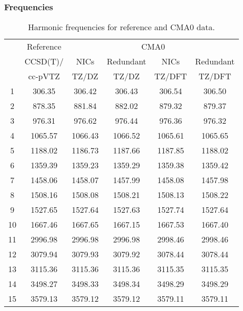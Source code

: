 \documentclass[10pt,oneside]{article}
\begin{document}
\begin{table}[h!]
\subsubsection*{Frequencies}
\centering
\caption{Harmonic frequencies for reference and CMA0 data.}
\begin{tabular}{cccccc}
\toprule
{} & Reference & \multicolumn{4}{c}{CMA0} \\
{} &  CCSD(T)/ &    NICs &  Redundant &    NICs & Redundant \\
{} &   cc-pVTZ &   TZ/DZ &      TZ/DZ &  TZ/DFT &    TZ/DFT \\
\midrule
1  &    306.35 &  306.42 &     306.43 &  306.54 &    306.50 \\
2  &    878.35 &  881.84 &     882.02 &  879.32 &    879.37 \\
3  &    976.31 &  976.62 &     976.44 &  976.36 &    976.32 \\
4  &   1065.57 & 1066.43 &    1066.52 & 1065.61 &   1065.65 \\
5  &   1188.02 & 1186.73 &    1187.66 & 1187.85 &   1188.02 \\
6  &   1359.39 & 1359.23 &    1359.29 & 1359.38 &   1359.42 \\
7  &   1458.06 & 1458.07 &    1457.99 & 1458.08 &   1457.98 \\
8  &   1508.16 & 1508.08 &    1508.21 & 1508.13 &   1508.22 \\
9  &   1527.65 & 1527.64 &    1527.63 & 1527.74 &   1527.64 \\
10 &   1667.46 & 1667.65 &    1667.15 & 1667.53 &   1667.40 \\
11 &   2996.98 & 2996.98 &    2996.98 & 2998.46 &   2998.46 \\
12 &   3079.94 & 3079.93 &    3079.92 & 3078.44 &   3078.44 \\
13 &   3115.36 & 3115.36 &    3115.36 & 3115.35 &   3115.35 \\
14 &   3498.27 & 3498.33 &    3498.34 & 3498.29 &   3498.29 \\
15 &   3579.13 & 3579.12 &    3579.12 & 3579.11 &   3579.11 \\
\bottomrule
\end{tabular}
\end{table}
\end{document}
